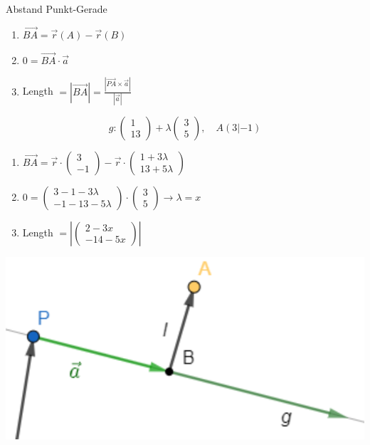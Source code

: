 \begin{KR}{Abstand Punkt-Gerade}
    \begin{enumerate}
        \item $\overrightarrow{BA} = \overrightarrow{r}(A) - \overrightarrow{r}(B)$
        \item $0 = \overrightarrow{BA} \cdot \overrightarrow{a}$
        \item Length $= |\overrightarrow{BA}| = \frac{|\overrightarrow{PA} \times \overrightarrow{a}|}{|\overrightarrow{a}|}$
    \end{enumerate}
\end{KR}

\begin{example}
    $$g: \begin{pmatrix} 1 \\ 13 \end{pmatrix} + \lambda \begin{pmatrix} 3 \\ 5 \end{pmatrix}, \quad A(3|-1)$$
    \begin{enumerate}
        \item $\overrightarrow{BA} = \vec{r} \cdot \begin{pmatrix} 3 \\ -1 \end{pmatrix} - \vec{r} \cdot \begin{pmatrix} 1 + 3 \lambda \\ 13 + 5 \lambda \end{pmatrix}$
        \item $0 = \begin{pmatrix} 3 - 1 - 3 \lambda \\ -1 - 13 - 5 \lambda \end{pmatrix} \cdot \begin{pmatrix} 3 \\ 5 \end{pmatrix} \rightarrow \lambda = x$
        \item Length $ = \left| \begin{pmatrix} 2 - 3x \\ -14 - 5x \end{pmatrix} \right|$ 
    \end{enumerate}
    \includegraphics[width=0.3\linewidth]{abstand.png}
\end{example}

